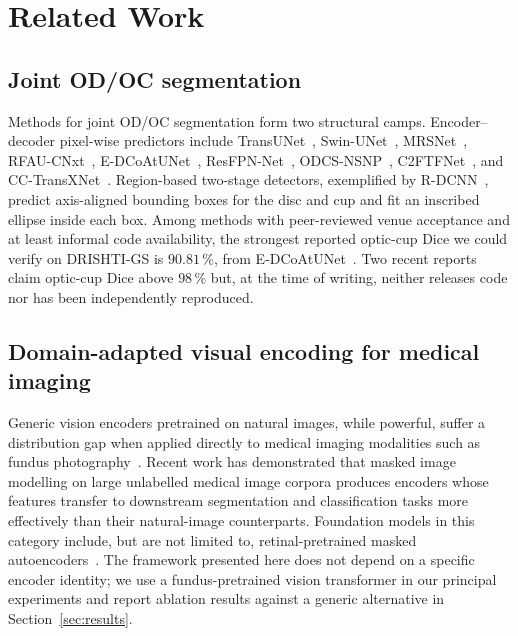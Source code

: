 \documentclass[10pt,journal,twocolumn]{IEEEtran}
\begin{document}
\section{Related Work}

\subsection{Joint OD/OC segmentation}

Methods for joint OD/OC segmentation form two structural camps. Encoder--decoder pixel-wise predictors include TransUNet~\cite{chen2021transunet}, Swin-UNet~\cite{cao2021swinunet}, MRSNet~\cite{mrsnet2023}, RFAU-CNxt~\cite{rfaucnxt2023}, E-DCoAtUNet~\cite{edcoatunet2025}, ResFPN-Net~\cite{resfpnnet2022}, ODCS-NSNP~\cite{odcsnsnp2023}, C2FTFNet~\cite{c2ftfnet2023}, and CC-TransXNet~\cite{cctransxnet2024}. Region-based two-stage detectors, exemplified by R-DCNN~\cite{li2023rdcnn}, predict axis-aligned bounding boxes for the disc and cup and fit an inscribed ellipse inside each box. Among methods with peer-reviewed venue acceptance and at least informal code availability, the strongest reported optic-cup Dice we could verify on DRISHTI-GS is $90.81\,\%$, from E-DCoAtUNet~\cite{edcoatunet2025}. Two recent reports~\cite{dbsegnet2025,dualoptitrans2026} claim optic-cup Dice above $98\,\%$ but, at the time of writing, neither releases code nor has been independently reproduced.

\subsection{Domain-adapted visual encoding for medical imaging}

Generic vision encoders pretrained on natural images, while powerful, suffer a distribution gap when applied directly to medical imaging modalities such as fundus photography~\cite{retfound2023nature}. Recent work has demonstrated that masked image modelling on large unlabelled medical image corpora produces encoders whose features transfer to downstream segmentation and classification tasks more effectively than their natural-image counterparts. Foundation models in this category include, but are not limited to, retinal-pretrained masked autoencoders~\cite{retfound2023nature,fundusegmenter2025}. The framework presented here does not depend on a specific encoder identity; we use a fundus-pretrained vision transformer in our principal experiments and report ablation results against a generic alternative in Section~\ref{sec:results}.
\end{document}
